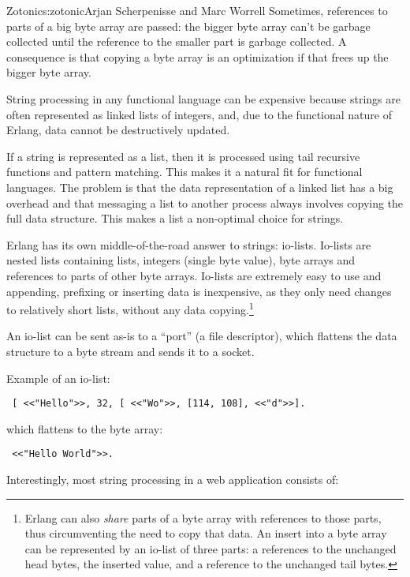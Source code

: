 \begin{aosachapter}{Zotonic}{s:zotonic}{Arjan Scherpenisse and Marc Worrell}
Sometimes, references to parts of a big byte array are passed: the
bigger byte array can't be garbage collected until the reference to the
smaller part is garbage collected. A consequence is that copying a byte
array is an optimization if that frees up the bigger byte array.


String processing in any functional language can be expensive because
strings are often represented as linked lists of integers, and, due to
the functional nature of Erlang, data cannot be destructively updated.

If a string is represented as a list, then it is processed using tail
recursive functions and pattern matching. This makes it a natural fit
for functional languages. The problem is that the data representation of
a linked list has a big overhead and that messaging a list to another
process always involves copying the full data structure. This makes a
list a non-optimal choice for strings.

Erlang has its own middle-of-the-road answer to strings: io-lists.
Io-lists are nested lists containing lists, integers (single byte
value), byte arrays and references to parts of other byte arrays.
Io-lists are extremely easy to use and appending, prefixing or inserting
data is inexpensive, as they only need changes to relatively short
lists, without any data copying.\footnote{Erlang can also \emph{share}
  parts of a byte array with references to those parts, thus
  circumventing the need to copy that data. An insert into a byte array
  can be represented by an io-list of three parts: a references to the
  unchanged head bytes, the inserted value, and a reference to the
  unchanged tail bytes.}

An io-list can be sent as-is to a ``port'' (a file descriptor), which
flattens the data structure to a byte stream and sends it to a socket.

Example of an io-list:

\begin{verbatim}
 [ <<"Hello">>, 32, [ <<"Wo">>, [114, 108], <<"d">>].
\end{verbatim}

\noindent which flattens to the byte array:

\begin{verbatim}
 <<"Hello World">>.
\end{verbatim}

\noindent Interestingly, most string processing in a web application consists of:


\end{aosachapter}
